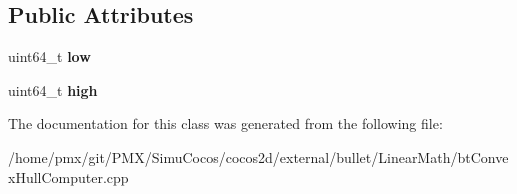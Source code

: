 \subsection*{Public Attributes}
\begin{DoxyCompactItemize}
\item 
\mbox{\label{classbtConvexHullInternal_1_1Int128_aeab001269c99bc766d2baef35a8aaaac}} 
uint64\+\_\+t {\bfseries low}
\item 
\mbox{\label{classbtConvexHullInternal_1_1Int128_a481438c6c1372ad316e572cdbacb6fc1}} 
uint64\+\_\+t {\bfseries high}
\end{DoxyCompactItemize}


The documentation for this class was generated from the following file\+:\begin{DoxyCompactItemize}
\item 
/home/pmx/git/\+P\+M\+X/\+Simu\+Cocos/cocos2d/external/bullet/\+Linear\+Math/bt\+Convex\+Hull\+Computer.\+cpp\end{DoxyCompactItemize}
